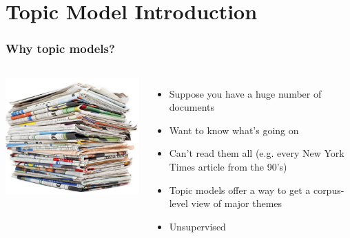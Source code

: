 

\providecommand{\graphscale}{0.6}


\newcommand{\dirfunc}[3]{ \frac{ \prod_{#1}^{#2} \g{ #3 } } { \g{ \sum_{#1}^{#2} #3 }}}
\newcommand{\dirnum}[4]{ \frac{\g{ #3 }}{#4} \prod_{#1}^{#2} }
\newcommand{\dirden}[3]{ \g{ \sum_{#1}^{#2} #3 } }

\section{Topic Model Introduction}

\begin{frame}

	\frametitle{Why topic models?}

	\begin{columns}


	\includegraphics[width=1\linewidth]{topic_models/newspapers}


	\begin{itemize}
		\item Suppose you have a huge number of documents
		\item Want to know what's going on
		\item Can't read them all (e.g. every New York Times article from the 90's)
		\item Topic models offer a way to get a corpus-level view of major themes
		\pause
		\item Unsupervised
	\end{itemize}


	\end{columns}

\end{frame}


